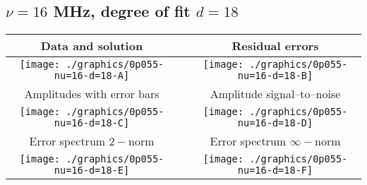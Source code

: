 

% 

\clearpage{}
\break{}

\subsection{$\nu = 16$ MHz, degree of fit $d = 18$}

\begin{table}[h]
    \begin{center}
        \begin{tabular}{ccc}
            Data and solution & \quad & Residual errors \\\hline
            \texttt{[image: ./graphics/0p055-nu=16-d=18-A]} &&
            \texttt{[image: ./graphics/0p055-nu=16-d=18-B]} \\[15pt]
            Amplitudes with error bars && Amplitude signal--to--noise \\\hline
            \texttt{[image: ./graphics/0p055-nu=16-d=18-C]} &&
            \texttt{[image: ./graphics/0p055-nu=16-d=18-D]} \\[15pt]
            Error spectrum $2-$norm && Error spectrum $\infty-$norm \\\hline
            \texttt{[image: ./graphics/0p055-nu=16-d=18-E]} &&
            \texttt{[image: ./graphics/0p055-nu=16-d=18-F]} \\[15pt]
        \end{tabular}
    \end{center}
\label{fig:elev=55, nu=16}
\end{table}



\endinput
